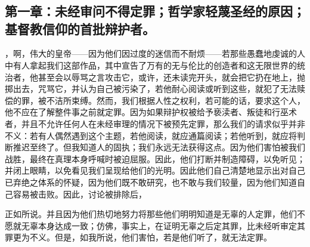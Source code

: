 

\section{}


\subsection{第一章：未经审问不得定罪；哲学家轻蔑圣经的原因；基督教信仰的首批辩护者。}

，啊，伟大的皇帝——因为他们因过度的迷信而不耐烦——若那些愚蠢地虔诚的人中有人拿起我们这部作品，其中宣告了万有的无与伦比的创造者和这无限世界的统治者，他甚至会以辱骂之言攻击它，或许，还未读完开头，就会把它扔在地上，抛掷出去，咒骂它，并认为自己被污染了，若他耐心阅读或听到这些，就犯了无法赎偿的罪，被不洁所束缚。然而，我们根据人性之权利，若可能的话，要求这个人，他不应在了解整件事之前就定罪。因为如果辩护权被给予亵渎者、叛徒和行巫术者，并且不允许任何人在未经审理的情况下被预先定罪，那么我们的请求似乎并非不义：若有人偶然遇到这个主题，若他阅读，就应通篇阅读；若他听到，就应将判断推迟至终了。但我知道人的固执；我们永远无法获得这点。因为他们害怕被我们战胜，最终在真理本身呼喊时被迫屈服。因此，他们打断并制造障碍，以免听见；并闭上眼睛，以免看见我们呈现给他们的光明。因此他们自己清楚地显示出对自己已弃绝之体系的怀疑，因为他们既不敢研究，也不敢与我们较量，因为他们知道自己容易被击败。因此，讨论被排除后，\par

\par

正如所说。并且因为他们热切地努力将那些他们明明知道是无辜的人定罪，他们不愿就无辜本身达成一致；仿佛，事实上，在证明无辜之后定其罪，比未经听审定其罪更为不义。但是，如我所说，他们害怕，若是他们听了，就无法定罪。\par

